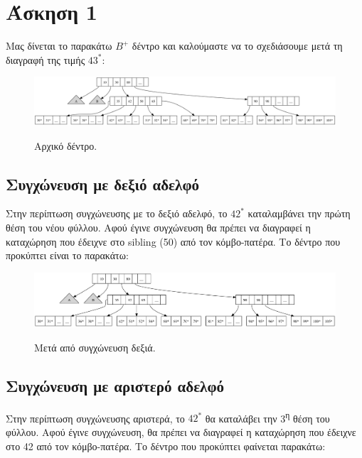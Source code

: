\documentclass[a4paper,11pt]{article}
\begin{document}
\renewcommand{\labelenumi}{\roman{enumi})}
\renewcommand{\labelenumii}{\arabic{enumii}.}



\section{Άσκηση 1} \setcounter{section}{1}

Μας δίνεται το παρακάτω $B^+$ δέντρο και καλούμαστε να το σχεδιάσουμε μετά τη
διαγραφή της τιμής $43^*$:
\begin{figure}[h]
\centering
\includegraphics[width=1\textwidth]{../files/init_tree.png}\\
\caption{Αρχικό δέντρο.}
\end{figure}

\subsection {Συγχώνευση με δεξιό αδελφό}
Στην περίπτωση συγχώνευσης με το δεξιό αδελφό, το $42^*$ καταλαμβάνει την
πρώτη θέση του νέου φύλλου. Αφού έγινε συγχώνευση θα πρέπει να διαγραφεί η
καταχώρηση που έδειχνε στο sibling (50) από τον κόμβο-πατέρα. Το δέντρο που
προκύπτει είναι το παρακάτω:

\begin{figure}[h]
\centering
\includegraphics[width=1\textwidth]{../files/tree1a.png}\\
\caption{Μετά από συγχώνευση δεξιά.}
\end{figure}

\subsection {Συγχώνευση με αριστερό αδελφό}
Στην περίπτωση συγχώνευσης αριστερά, το $42^*$ θα καταλάβει την
3\textsuperscript{η} θέση του φύλλου. Αφού έγινε συγχώνευση, θα πρέπει να
διαγραφεί η καταχώρηση που έδειχνε στο 42 από τον κόμβο-πατέρα. Το δέντρο που
προκύπτει φαίνεται παρακάτω:
\end{document}
